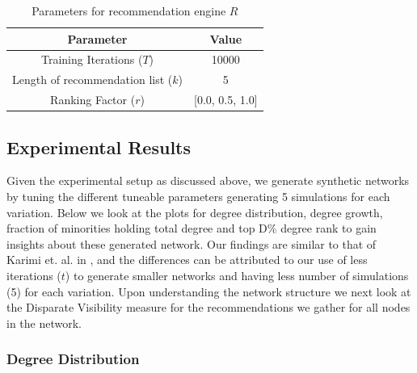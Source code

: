 \begin{table}[h]
	\centering
	\begin{tabular}{ |c|c| }
		\hline
		\textbf{Parameter} & \textbf{Value} \\
		\hline
		Training Iterations ($T$) & 10000 \\
		Length of recommendation list ($k$) & 5 \\
		Ranking Factor ($r$) & [0.0, 0.5, 1.0] \\
		\hline
	\end{tabular}
	\caption{Parameters for recommendation engine $R$}
	\label{table_recommendation}
\end{table}

\subsection{Experimental Results}
Given the experimental setup as discussed above, we generate synthetic networks by tuning the different tuneable parameters generating 5 simulations for each variation. Below we look at the plots for degree distribution, degree growth, fraction of minorities holding total degree and top D\% degree rank to gain insights about these generated network. Our findings are similar to that of Karimi et. al. in \cite{karimi2018homophily}, and the differences can be attributed to our use of less iterations ($t$) to generate smaller networks and having less number of simulations (5) for each variation. Upon understanding the network structure we next look at the Disparate Visibility \cite{fabbri2020effect} measure for the recommendations we gather for all nodes in the network. 

\subsubsection{Degree Distribution}

